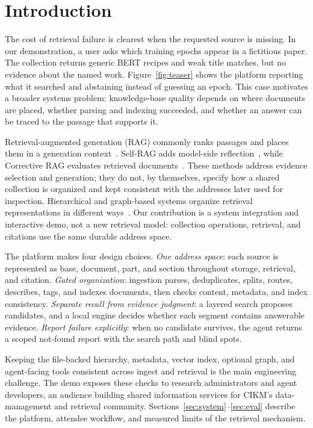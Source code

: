 \section{Introduction}
\label{sec:intro}

The cost of retrieval failure is clearest when the requested source is
missing. In our demonstration, a user asks which training epochs appear
in a fictitious paper. The collection returns generic BERT recipes and
weak title matches, but no evidence about the named work. Figure~\ref{fig:teaser}
shows the platform reporting what it searched and abstaining instead of
guessing an epoch. This case motivates a broader systems problem:
knowledge-base quality depends on where documents are placed, whether
parsing and indexing succeeded, and whether an answer can be traced to
the passage that supports it.

Retrieval-augmented generation (RAG) commonly ranks passages and places
them in a generation context~\cite{rag-lewis}. Self-RAG adds model-side
reflection~\cite{selfrag}, while Corrective RAG evaluates retrieved
documents~\cite{crag}. These methods address evidence selection and
generation; they do not, by themselves, specify how a shared collection
is organized and kept consistent with the addresses later used for
inspection. Hierarchical and graph-based systems organize retrieval
representations in different ways~\cite{raptor,deepread,graphrag,lightrag}.
Our contribution is a system integration and interactive demo, not a new
retrieval model: collection operations, retrieval, and citations use the
same durable address space.

The platform makes four design choices. \emph{One address space}: each
source is represented as base, document, part, and section throughout
storage, retrieval, and citation. \emph{Gated organization}: ingestion
parses, deduplicates, splits, routes, describes, tags, and indexes
documents, then checks content, metadata, and index consistency.
\emph{Separate recall from evidence judgment}: a layered search proposes
candidates, and a local engine decides whether each segment contains
answerable evidence. \emph{Report failure explicitly}: when no candidate
survives, the agent returns a scoped not-found report with the search
path and blind spots.

Keeping the file-backed hierarchy, metadata, vector index, optional
graph, and agent-facing tools consistent across ingest and retrieval is
the main engineering challenge. The demo exposes these checks to
research administrators and agent developers, an audience building
shared information services for CIKM's data-management and retrieval
community. Sections~\ref{sec:system}--\ref{sec:eval} describe the
platform, attendee workflow, and measured limits of the retrieval
mechanism.
